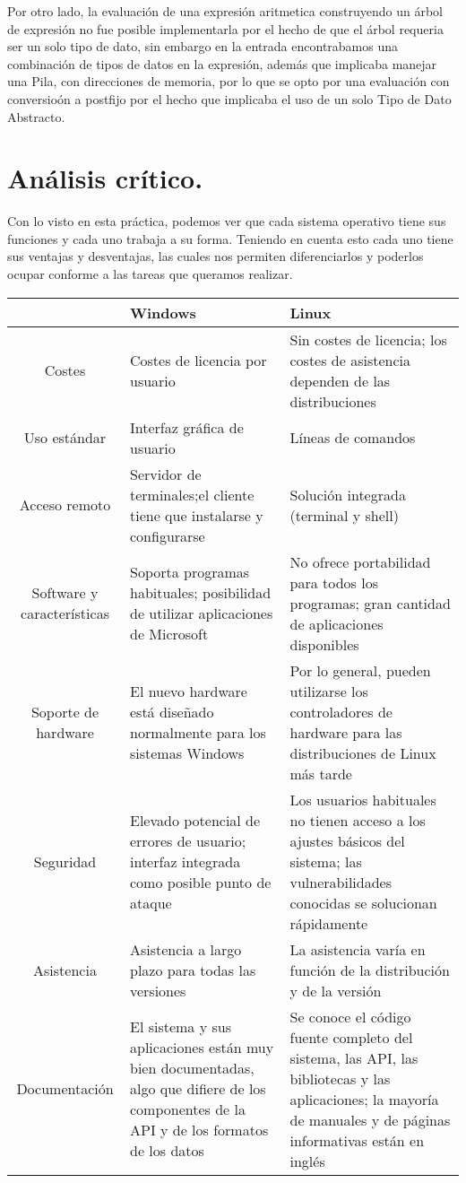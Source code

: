 \documentclass[12pt]{article}
\begin{document}
Por otro lado, la evaluación de una expresión aritmetica construyendo un árbol de expresión no fue posible implementarla por el hecho de que el árbol requeria ser un solo tipo de dato, sin embargo en la entrada encontrabamos una combinación de tipos de datos en la expresión, además que implicaba manejar una Pila, con direcciones de memoria, por lo que se opto por una evaluación con conversioón a postfijo por el hecho que implicaba el uso de un solo Tipo de Dato Abstracto.
\section{Análisis crítico.}

    Con lo visto en esta práctica, podemos ver que cada sistema operativo tiene sus funciones y cada uno trabaja a su forma. Teniendo en cuenta esto cada uno tiene sus ventajas y desventajas, las cuales nos permiten diferenciarlos y poderlos ocupar conforme a las tareas que queramos realizar.\\
    \begin{tabular}{||c|p{6.0cm}|p{6.0cm}||}
        \hline
        \hline & Windows & Linux\\ 
        \hline
        \hline Costes & Costes de licencia por usuario & Sin costes de licencia; los costes de asistencia dependen de las distribuciones\\
        \hline Uso estándar & Interfaz gráfica de usuario &	Líneas de comandos\\
        \hline Acceso remoto &Servidor de terminales;el cliente tiene que instalarse y configurarse & Solución integrada (terminal y shell)\\
        \hline Software y características & Soporta programas habituales; posibilidad de utilizar aplicaciones de Microsoft
            & No ofrece portabilidad para todos los programas; gran cantidad de aplicaciones disponibles\\
        \hline Soporte de hardware & El nuevo hardware está diseñado normalmente para los sistemas Windows
            & Por lo general, pueden utilizarse los controladores de hardware para las distribuciones de Linux más tarde\\
        \hline Seguridad & Elevado potencial de errores de usuario; interfaz integrada como posible punto de ataque 
            & Los usuarios habituales no tienen acceso a los ajustes básicos del sistema; las vulnerabilidades conocidas se solucionan rápidamente\\
        \hline Asistencia & Asistencia a largo plazo para todas las versiones &	La asistencia varía en función de la distribución y de la versión \\
        \hline Documentación & El sistema y sus aplicaciones están muy bien documentadas, algo que difiere de los componentes de la API y de los formatos de los datos &	Se conoce el código fuente completo del sistema, las API, las bibliotecas y las aplicaciones; la mayoría de manuales y de páginas informativas están en inglés\\
        \hline
        \hline
    \end{tabular}
    
\end{document}
